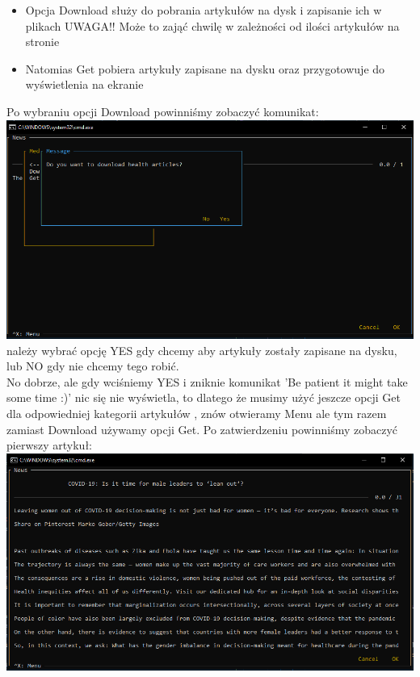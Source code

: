 \documentclass{article}
\begin{document}
\begin{itemize}
    \item Opcja Download służy do pobrania artykułów na dysk i zapisanie ich w plikach UWAGA!! Może to zająć chwilę w zależności od ilości artykułów na stronie
    \item Natomias Get pobiera artykuły zapisane na dysku oraz przygotowuje do wyświetlenia na ekranie
\end{itemize}

Po wybraniu opcji Download powinniśmy zobaczyć komunikat:\\
\includegraphics[width=\textwidth]{images/download_articles.png}
należy wybrać opcję YES gdy chcemy aby artykuły zostały zapisane na dysku, lub NO gdy nie chcemy tego robić.\\

\pagebreak
No dobrze, ale gdy wciśniemy YES i zniknie komunikat 'Be patient it might take some time :)' nic się nie wyświetla,
to dlatego że musimy użyć jeszcze opcji Get dla odpowiedniej kategorii artykułów , znów otwieramy Menu ale tym razem zamiast Download używamy opcji Get.
Po zatwierdzeniu powinniśmy zobaczyć pierwszy artykuł:\\

\includegraphics[width=\textwidth]{images/first_article.png}\\
\end{document}
